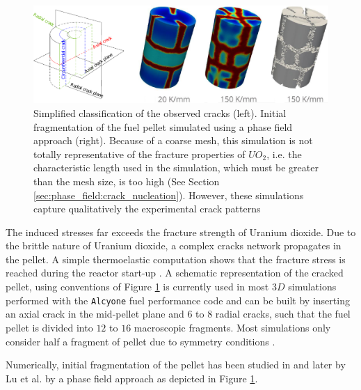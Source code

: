 \begin{figure}[H]
  \centering
  \includegraphics[width=10.cm]{../chapter_00_introduction/figures/CrackNetwork.pdf}
  \caption{Simplified classification of the observed cracks (left). Initial
  fragmentation of the fuel pellet simulated using a phase field approach
  \cite{2019_LU_HELFER_BARY_FANDEUR_UnSchemaNumeriqueEfficacePourLeTraitementDeLaFissurationFragileDesMateriauxQuasiFragilesParChampDePhase} (right). Because of a coarse mesh, this
  simulation is not totally representative of the fracture properties of
  \(UO_{2}\), i.e. the characteristic length used in the simulation, which
  must be greater than the mesh size, is too high (See Section
  \ref{sec:phase_field:crack_nucleation}). However, these simulations capture
  qualitatively the experimental crack patterns}
  \label{fig:hho:crack_network}
\end{figure}

The induced stresses far exceeds the fracture strength of Uranium
dioxide. Due to the brittle nature of Uranium dioxide, a complex cracks
network propagates in the pellet. A simple thermoelastic computation
shows that the fracture stress is reached during the reactor start-up
\cite{helfer_etude_2006}. A schematic representation of the cracked pellet,
using conventions of Figure \ref{fig:hho:crack_network} is currently used in
most \(3D\) simulations performed with the \texttt{Alcyone} fuel performance
code and can be built by inserting an axial crack in the mid-pellet
plane and \(6\) to \(8\) radial cracks, such that the fuel pellet is
divided into \(12\) to \(16\) macroscopic fragments. Most simulations
only consider half a fragment of pellet due to symmetry conditions
\cite{michel_pellet_2005}.

Numerically, initial fragmentation of the pellet has been studied in
\cite{helfer_modelisation_2017} and later by Lu et al. \cite{2019_LU_HELFER_BARY_FANDEUR_UnSchemaNumeriqueEfficacePourLeTraitementDeLaFissurationFragileDesMateriauxQuasiFragilesParChampDePhase} by a
phase field approach as depicted in Figure
\ref{fig:hho:crack_network}.

